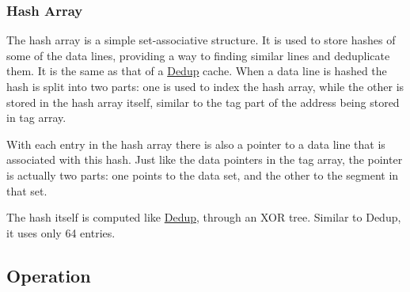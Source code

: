 \subsubsection{Hash Array}
\label{sssec:DedupBDIHash}
The hash array is a simple set-associative structure. It is used to store hashes of some of the data lines, providing a way to finding similar lines and deduplicate them. It is the same as that of a \hyperref[sssec:DedupHash]{Dedup} cache. When a data line is hashed the hash is split into two parts: one is used to index the hash array, while the other is stored in the hash array itself, similar to the tag part of the address being stored in tag array.\par
With each entry in the hash array there is also a pointer to a data line that is associated with this hash. Just like the data pointers in the tag array, the pointer is actually two parts: one points to the data set, and the other to the segment in that set.\par
The hash itself is computed like \hyperref[sssec:DedupHash]{Dedup}, through an XOR tree. Similar to Dedup, it uses only 64 entries.

\subsection{Operation}
\label{ssec:DedupBDIOperations}
